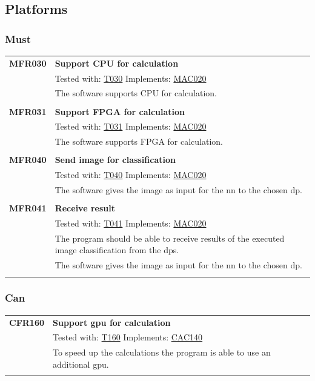 \documentclass[parskip=full]{scrartcl}
\begin{document}
\subsection{Platforms}
\subsubsection{Must}
\begin{tabular}{p{2cm}p{11.4cm}}
\textbf {MFR030}\hypertarget{MFR030} & \textbf{Support CPU for calculation} \\
& Tested with: \hyperlink{T030}{T030} Implements: \hyperlink{MAC020}{MAC020} \\
& The software supports CPU for calculation. \\
& \\
\textbf {MFR031}\hypertarget{MFR031}  & \textbf{Support FPGA for calculation} \\
& Tested with: \hyperlink{T031}{T031} Implements: \hyperlink{MAC020}{MAC020} \\
& The software supports FPGA for calculation. \\
& \\
\textbf {MFR040} \hypertarget{MFR040}& \textbf{Send image for classification} \\
& Tested with: \hyperlink{T040}{T040} Implements: \hyperlink{MAC020}{MAC020} \\
& The software gives the image as input for the \gls{nn} to the chosen \gls{dp}. \\
& \\
\textbf {MFR041} \hypertarget{MFR041}& \textbf{Receive result} \\
& Tested with: \hyperlink{T041}{T041} Implements: \hyperlink{MAC020}{MAC020} \\
& The program should be able to receive results of the executed \gls{image classification} from the \glspl{dp}. \\
& The software gives the image as input for the {nn} to the chosen \gls{dp}. \\
& \\
\end{tabular}
\subsubsection{Can}
\begin{tabular}{p{2cm}p{11.4cm}}
\textbf {CFR160} \hypertarget{CFR160} & \textbf{Support \gls{gpu} for calculation} \\
& Tested with: \hyperlink{T160}{T160} Implements: \hyperlink{CAC140}{CAC140} \\
& To speed up the calculations the program is able to use an additional \gls{gpu}.\\
& \\
\end{tabular}
\end{document}
